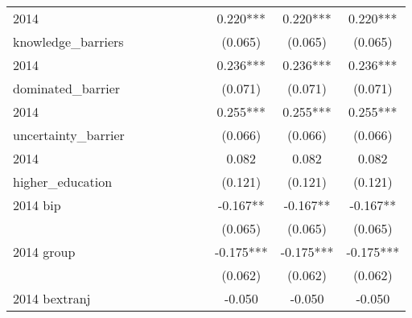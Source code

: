 \begin{table}[htbp]
\begin{tabular}{l*{9}{c}}
2014                &               &               &               &               &               &               &       0.220***&       0.220***&       0.220***\\
knowledge\_barriers  &               &               &               &               &               &               &     (0.065)   &     (0.065)   &     (0.065)   \\
2014                &               &               &               &               &               &               &       0.236***&       0.236***&       0.236***\\
dominated\_barrier   &               &               &               &               &               &               &     (0.071)   &     (0.071)   &     (0.071)   \\
2014                &               &               &               &               &               &               &       0.255***&       0.255***&       0.255***\\
uncertainty\_barrier &               &               &               &               &               &               &     (0.066)   &     (0.066)   &     (0.066)   \\
2014                &               &               &               &               &               &               &       0.082   &       0.082   &       0.082   \\
higher\_education    &               &               &               &               &               &               &     (0.121)   &     (0.121)   &     (0.121)   \\
2014 bip            &               &               &               &               &               &               &      -0.167** &      -0.167** &      -0.167** \\
                    &               &               &               &               &               &               &     (0.065)   &     (0.065)   &     (0.065)   \\
2014 group          &               &               &               &               &               &               &      -0.175***&      -0.175***&      -0.175***\\
                    &               &               &               &               &               &               &     (0.062)   &     (0.062)   &     (0.062)   \\
2014 bextranj       &               &               &               &               &               &               &      -0.050   &      -0.050   &      -0.050   \\

\end{tabular}
\end{table}

